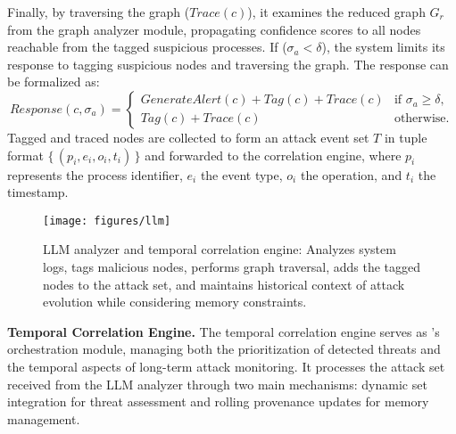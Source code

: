 \noindent Finally, by traversing the graph ($Trace(c)$), it examines the reduced graph $G_r$ from the graph analyzer module, propagating confidence scores to all nodes reachable from the tagged suspicious processes. If ($\sigma_a < \delta$), the system limits its response to tagging suspicious nodes and traversing the graph.
The response can be formalized as:
\begin{equation}
	Response(c, \sigma_a) = 
	\begin{cases}
		GenerateAlert(c) + Tag(c) + Trace(c) & \text{if } \sigma_a \geq \delta, \\
		Tag(c) + Trace(c) & \text{otherwise}.
	\end{cases}
\end{equation}
Tagged and traced nodes are collected to form an attack event set $T$ in tuple format $\{\, (p_i, e_i, o_i, t_i) \,\}$ and forwarded to the correlation engine, where $p_i$ represents the process identifier, $e_i$ the event type, $o_i$ the operation, and $t_i$ the timestamp.\\

\begin{figure}[!ht]
\setlength{\abovecaptionskip}{3pt}
\setlength{\belowcaptionskip}{0pt}
\centering
\texttt{[image: figures/llm]}
\caption{LLM analyzer and temporal correlation engine: Analyzes system logs, tags malicious nodes, performs graph traversal, adds the tagged nodes to the attack set, and maintains historical context of attack evolution while considering memory constraints.}
\label{fig:llm_analyzer}
\end{figure}

\noindent\textbf{Temporal Correlation Engine.}
The temporal correlation engine serves as \method's orchestration module, managing both the prioritization of detected threats and the temporal aspects of long-term attack monitoring. 
It processes the attack set received from the LLM analyzer through two main mechanisms: dynamic set integration for threat assessment and rolling provenance updates for memory management.

